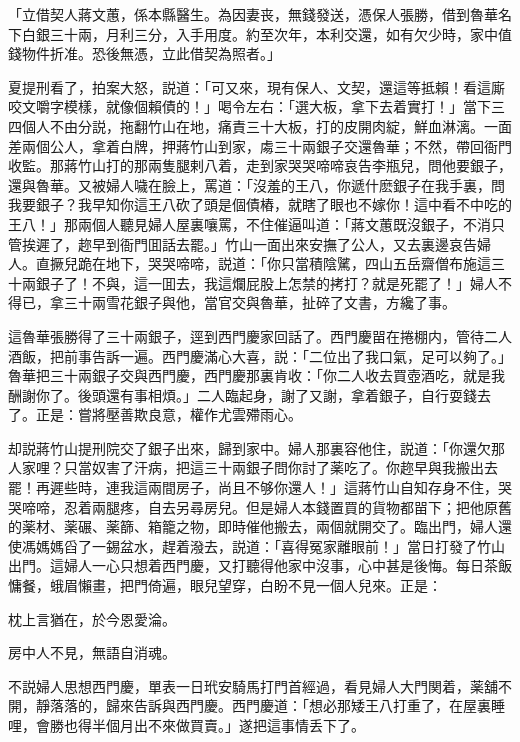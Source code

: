\begin{myquote}[\markfont]
「立借契人蔣文蕙，係本縣醫生。為因妻丧，無錢發送，憑保人張勝，借到魯華名下白銀三十兩，月利三分，入手用度。約至次年，本利交還，如有欠少時，家中值錢物件折准。恐後無憑，立此借契為照者。」
\end{myquote}

夏提刑看了，拍案大怒，説道：「可又來，現有保人、文契，還這等抵賴！看這廝咬文嚼字模樣，就像個賴債的！」喝令左右：「選大板，拿下去着實打！」當下三四個人不由分説，拖翻竹山在地，痛責三十大板，打的皮開肉綻，鮮血淋漓。一面差兩個公人，拿着白牌，押蔣竹山到家，䖏三十兩銀子交還魯華；不然，帶回衙門收監。那蔣竹山打的那兩隻腿剌八着，走到家哭哭啼啼哀告李瓶兒，問他要銀子，還與魯華。又被婦人噦在臉上，罵道：「沒羞的王八，你遞什麽銀子在我手裏，問我要銀子？我早知你這王八砍了頭是個債樁，就瞎了眼也不嫁你！這中看不中吃的王八！」那兩個人聽見婦人屋裏嚷罵，不住催逼叫道：「蔣文蕙既沒銀子，不消只管挨遲了，趂早到衙門囬話去罷。」竹山一面出來安撫了公人，又去裏邊哀告婦人。直撅兒跪在地下，哭哭啼啼，説道：「你只當積陰騭，四山五岳齋僧布施這三十兩銀子了！不與，這一囬去，我這爛屁股上怎禁的拷打？就是死罷了！」婦人不得已，拿三十兩雪花銀子與他，當官交與魯華，扯碎了文書，方纔了事。

這魯華張勝得了三十兩銀子，逕到西門慶家回話了。西門慶㽞在捲棚内，管待二人酒飯，把前事告訴一遍。西門慶滿心大喜，説：「二位出了我口氣，足可以夠了。」魯華把三十兩銀子交與西門慶，西門慶那裏肯收：「你二人收去買壺酒吃，就是我酬謝你了。後頭還有事相煩。」二人臨起身，謝了又謝，拿着銀子，自行耍錢去了。正是：嘗將壓善欺良意，權作尤雲殢雨心。

却説蔣竹山提刑院交了銀子出來，歸到家中。婦人那裏容他住，説道：「你還欠那人家哩？只當奴害了汗病，把這三十兩銀子問你討了薬吃了。你趂早與我搬出去罷！再遲些時，連我這兩間房子，尚且不够你還人！」這蔣竹山自知存身不住，哭哭啼啼，忍着兩腿疼，自去另尋房兒。但是婦人本錢置買的貨物都㽞下；把他原舊的薬材、薬碾、薬篩、箱籠之物，即時催他搬去，兩個就開交了。臨出門，婦人還使馮媽媽舀了一錫盆水，趕着潑去，説道：「喜得冤家離眼前！」當日打發了竹山出門。這婦人一心只想着西門慶，又打聽得他家中沒事，心中甚是後悔。每日茶飯慵餐，蛾眉懶畫，把門倚遍，眼兒望穿，白盼不見一個人兒來。正是：

\begin{myquote}
枕上言猶在，於今恩愛淪。

房中人不見，無語自消魂。
\end{myquote}

不説婦人思想西門慶，單表一日玳安騎馬打門首經過，看見婦人大門関着，薬舖不開，靜落落的，歸來告訴與西門慶。西門慶道：「想必那矮王八打重了，在屋裏睡哩，會勝也得半個月出不來做買賣。」遂把這事情丢下了。

